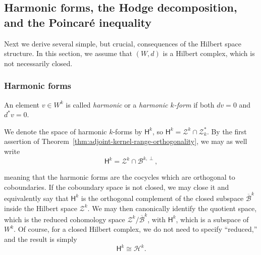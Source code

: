 \subsection{{Harmonic forms, the Hodge decomposition, and the Poincaré inequality}}\label{sec:harmonic-hodge-poincare}

{Next we derive several simple, but crucial, consequences of the Hilbert space structure. In this section, we assume that $(W,d)$ is a Hilbert complex, which is not necessarily closed.}

\subsubsection{{Harmonic forms}}\label{subsec:harmonic-forms}

\begin{Definition}\label{def:harmonic-form}
{An element $v\in W^k$ is called \emph{harmonic} or a \emph{harmonic $k$-form} if both $dv=0$ and $d^*v=0$.}
\end{Definition}

{We denote the space of harmonic $k$-forms by $\mathsf H^k$, so $\mathsf H^k=\mathcal Z^k\cap\mathcal Z_k^*$. By the first assertion of Theorem~\ref{thm:adjoint-kernel-range-orthogonality}, we may as well write}
\begin{equation}\label{eq:harmonic-cocycle-orthogonality}
\mathsf H^k=\mathcal Z^k\cap\mathcal B^{k,\perp},
\end{equation}

{meaning that the harmonic forms are the cocycles which are orthogonal to coboundaries. If the coboundary space is not closed, we may close it and equivalently say that $\mathsf H^k$ is the orthogonal complement of the closed subspace $\overline{\mathcal B}^k$ inside the Hilbert space $\mathcal Z^k$. We may then canonically identify the quotient space, which is the reduced cohomology space $\mathcal Z^k/\overline{\mathcal B}^k$, with $\mathsf H^k$, which is a subspace of $W^k$. Of course, for a closed Hilbert complex, we do not need to specify ``reduced,'' and the result is simply}
\begin{equation}\label{eq:harmonic-cohomology-isomorphism}
\mathsf H^k\cong\mathcal H^k.
\end{equation}

